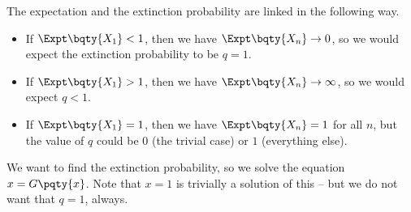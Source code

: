 The expectation and the extinction probability are linked in the following way.

\begin{itemize}
    \item If \(\Expt\bqty{X_1} < 1\), then we have \(\Expt\bqty{X_n} \to 0\), so we would expect the extinction probability to be \(q = 1\).

    \item If \(\Expt\bqty{X_1} > 1\), then we have \(\Expt\bqty{X_n} \to \infty\), so we would expect \(q < 1\).
    
    \item If \(\Expt\bqty{X_1} = 1\), then we have \(\Expt\bqty{X_n} = 1\) for all \(n\), but the value of \(q\) could be \(0\) (the trivial case) or \(1\) (everything else).
\end{itemize}

We want to find the extinction probability, so we solve the equation \(x = G\pqty{x}\). Note that \(x = 1\) is trivially a solution of this -- but we do not want that \(q = 1\), always.

